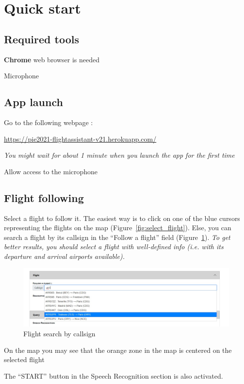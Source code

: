 \documentclass[12pt,oneside,a4]{article}
\let\tempone\itemize
\let\temptwo\enditemize
\renewenvironment{itemize}{\tempone\addtolength{\itemsep}{-0.5\baselineskip}}{\temptwo}
\newcommand{\linkdeploy}{https://pie2021-flightassistant-v21.herokuapp.com/}
\begin{document}
\section{Quick start}

\subsection{Required tools}
\begin{itemize}
    \item \textbf{Chrome} web browser is needed
    \item Microphone
\end{itemize}

\subsection{App launch}
\begin{itemize}
    \item Go to the following webpage : 
    \begin{center}
        \vspace{-.4em}
        \url{\linkdeploy}
    \end{center}
    \textit{You might wait for about 1 minute when you launch the app for the first time}
    \item Allow access to the microphone
\end{itemize}

\subsection{Flight following}

\begin{itemize}
    \item Select a flight to follow it. The easiest way is to click on one of the blue cursors representing the flights on the map (Figure~\ref{fig:select_flight}). 
    Else, you can search a flight by its callsign in the ``Follow a flight'' field (Figure~\ref{fig:search_flight}).
    \textit{To get better results, you should select a flight with well-defined info (i.e. with its departure and arrival airports available).}
    
    \begin{figure}[h!]
        \centering
        \includegraphics[width=.9\linewidth]{search_flight.jpg}
        \caption{Flight search by callsign}
        \label{fig:search_flight}
    \end{figure}
    \item On the map you may see that the orange zone in the map is centered on the selected flight
    \item The ``START'' button in the Speech Recognition section is also activated.
\end{itemize}
\end{document}
